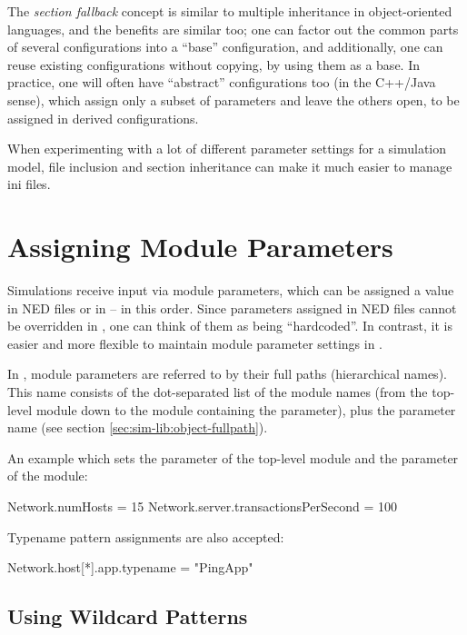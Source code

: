 The \textit{section fallback} concept is similar to multiple inheritance in
object-oriented languages, and the benefits are similar too; one can factor out
the common parts of several configurations into a ``base'' configuration,
and additionally, one can reuse existing configurations without copying, by
using them as a base. In practice, one will often have ``abstract''
configurations too (in the C++/Java sense), which assign only a subset of
parameters and leave the others open, to be assigned in derived
configurations.

When experimenting with a lot of different parameter settings for a
simulation model, file inclusion and section inheritance can make it much
easier to manage ini files.


\section{Assigning Module Parameters}
\label{sec:config-sim:parameter-settings}

Simulations receive input via module parameters, which can be assigned a
value in NED files or in  -- in this order. Since parameters
assigned in NED files cannot be overridden in , one can
think of them as being ``hardcoded''. In contrast, it is easier
and more flexible to maintain module parameter settings in .

In , module parameters are referred to by their full paths
(hierarchical names). This name consists of the dot-separated list of
the module names (from the top-level module down to the module containing
the parameter), plus the parameter name (see section \ref{sec:sim-lib:object-fullpath}).

An example  which sets the  parameter of
the top-level module and the  parameter of the
 module:

\begin{inifile}
[General]
Network.numHosts = 15
Network.server.transactionsPerSecond = 100
\end{inifile}

Typename pattern assignments are also accepted:

\begin{inifile}
[General]
Network.host[*].app.typename = "PingApp"
\end{inifile}


\subsection{Using Wildcard Patterns}
\label{sec:config-sim:wildcards}

